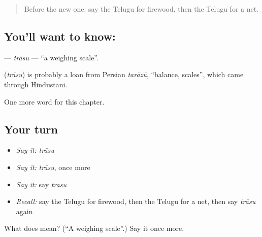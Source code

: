 \label{lesson:TE-C191-trasu}



\begin{quote}
Before the new one: say the Telugu for firewood, then the Telugu for a net.
\end{quote}

\subsection*{You'll want to know: }
\textbf{} — \emph{trāsu} — \textquotedblleft{}a weighing scale\textquotedblright{}.

\begin{cousinweb}
\textbf{} (\emph{trāsu}) is probably a loan from Persian \emph{tarāzū}, \textquotedblleft{}balance, scales\textquotedblright{}, which came through Hindustani.
\end{cousinweb}

\begin{grammarlens}[title={What you've built}]
One more word for this chapter.
\end{grammarlens}

\subsection*{Your turn}
\begin{itemize}
\raggedright
  \item \emph{Say it:} \emph{trāsu}
  \item \emph{Say it:} \emph{trāsu}, once more
  \item \emph{Say it:} say \emph{trāsu}
  \item \emph{Recall:} say the Telugu for firewood, then the Telugu for a net, then say \emph{trāsu} again
\end{itemize}

\begin{tcolorbox}[breakable,colback=teal!4,colframe=teal!35!black,title={Before you move on}]
What does  mean? (\textquotedblleft{}A weighing scale\textquotedblright{}.) Say it once more.
\end{tcolorbox}
